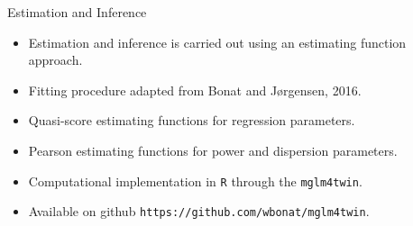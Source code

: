 \documentclass[
  ignorenonframetext,
  serif,
  professionalfont,
  usenames,
  dvipsnames,
  aspectratio = 169]{beamer}
\providecommand{\tightlist}{%
  \setlength{\itemsep}{0pt}\setlength{\parskip}{0pt}}
\renewcommand{\tightlist}{%
  \setlength{\itemsep}{0\baselineskip}
  \setlength{\parskip}{0.25\baselineskip}
}
\begin{document}
\begin{frame}{Estimation and Inference}
\protect\hypertarget{estimation-and-inference-1}{}
\begin{itemize}
\tightlist
\item
  Estimation and inference is carried out using an estimating function
  approach.
\item
  Fitting procedure adapted from Bonat and J\o rgensen, 2016.
\item
  Quasi-score estimating functions for regression parameters.
\item
  Pearson estimating functions for power and dispersion parameters.
\item
  Computational implementation in \texttt{R} through the
  \texttt{mglm4twin}.
\item
  Available on github \texttt{https://github.com/wbonat/mglm4twin}.
\end{itemize}
\end{frame}
\end{document}
